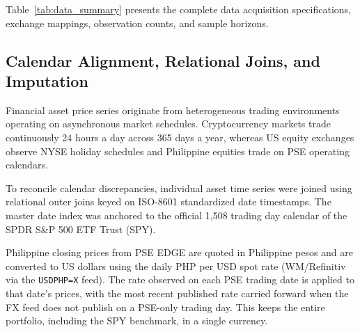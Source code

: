 Table~\ref{tab:data_summary} presents the complete data acquisition specifications, exchange mappings, observation counts, and sample horizons.



\subsection{Calendar Alignment, Relational Joins, and Imputation}

Financial asset price series originate from heterogeneous trading environments operating on asynchronous market schedules. Cryptocurrency markets trade continuously 24 hours a day across 365 days a year, whereas US equity exchanges observe NYSE holiday schedules and Philippine equities trade on PSE operating calendars.

To reconcile calendar discrepancies, individual asset time series were joined using relational outer joins keyed on ISO-8601 standardized date timestamps. The master date index was anchored to the official 1,508 trading day calendar of the SPDR S\&P 500 ETF Trust (SPY).

Philippine closing prices from PSE EDGE are quoted in Philippine pesos and are converted to US dollars using the daily PHP per USD spot rate (WM/Refinitiv via the \texttt{USDPHP=X} feed). The rate observed on each PSE trading date is applied to that date's prices, with the most recent published rate carried forward when the FX feed does not publish on a PSE-only trading day. This keeps the entire portfolio, including the SPY benchmark, in a single currency.

